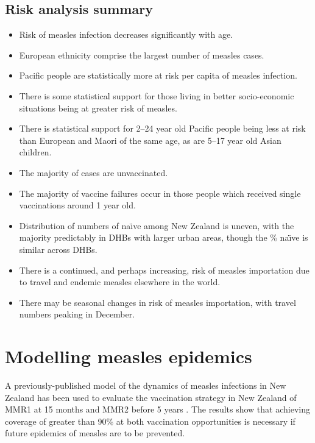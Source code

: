 \documentclass{article}
\begin{document}
\subsection{Risk analysis summary}
\begin{itemize}
\item Risk of measles infection decreases significantly with age.
\item European ethnicity comprise the largest number of measles cases.
\item Pacific people are statistically more at risk per capita of measles infection.
\item There is some statistical support for those living in better socio-economic situations being at greater risk of measles.
\item There is statistical support for 2--24 year old Pacific people being less at risk than European and Maori of the same age, as are 5--17 year old Asian children.
\item The majority of cases are unvaccinated.
\item The majority of vaccine failures occur in those people which received single vaccinations around 1 year old.
\item Distribution of numbers of na\"{\i}ve among New Zealand is uneven, with the majority predictably in DHBs with larger urban areas, though the \%  na\"{\i}ve is similar across DHBs.
\item There is a continued, and perhaps increasing, risk of measles importation due to travel and endemic measles elsewhere in the world.
\item There may be seasonal changes in risk of measles importation, with travel numbers peaking in December.
\end{itemize}

\section{Modelling measles epidemics}
\label{section:epidemic_modelling}

A previously-published model of the dynamics of measles infections in New Zealand has been used to evaluate the vaccination strategy in New Zealand of MMR1 at 15 months and MMR2 before 5 years \citep{roberts0,roberts4,tobias98}. The results show that achieving coverage of greater than 90\% at both vaccination opportunities is necessary if future epidemics of measles are to be prevented.
\end{document}
